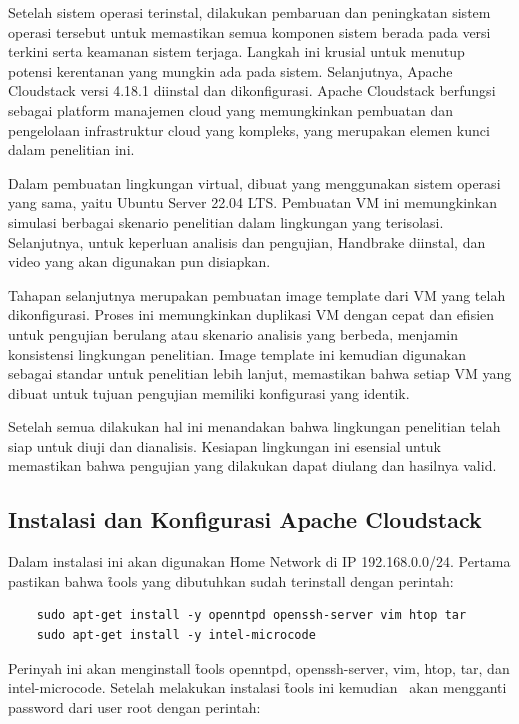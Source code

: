 Setelah sistem operasi terinstal, dilakukan pembaruan dan peningkatan sistem operasi tersebut untuk memastikan semua komponen sistem berada pada versi terkini serta keamanan sistem terjaga. Langkah ini krusial untuk menutup potensi kerentanan yang mungkin ada pada sistem. Selanjutnya, Apache Cloudstack versi 4.18.1 diinstal dan dikonfigurasi. Apache Cloudstack berfungsi sebagai platform manajemen cloud yang memungkinkan pembuatan dan pengelolaan infrastruktur cloud yang kompleks, yang merupakan elemen kunci dalam penelitian ini.

Dalam pembuatan lingkungan virtual, dibuat \vm yang menggunakan sistem operasi yang sama, yaitu Ubuntu Server 22.04 LTS. Pembuatan VM ini memungkinkan simulasi berbagai skenario penelitian dalam lingkungan yang terisolasi. Selanjutnya, untuk keperluan analisis dan pengujian, Handbrake diinstal, dan video yang akan digunakan pun disiapkan.

Tahapan selanjutnya merupakan pembuatan image template dari VM yang telah dikonfigurasi. Proses ini memungkinkan duplikasi VM dengan cepat dan efisien untuk pengujian berulang atau skenario analisis yang berbeda, menjamin konsistensi lingkungan penelitian. Image template ini kemudian digunakan sebagai standar untuk penelitian lebih lanjut, memastikan bahwa setiap VM yang dibuat untuk tujuan pengujian memiliki konfigurasi yang identik.

Setelah semua dilakukan hal ini menandakan bahwa lingkungan penelitian telah siap untuk diuji dan dianalisis. Kesiapan lingkungan ini esensial untuk memastikan bahwa pengujian yang dilakukan dapat diulang dan hasilnya valid.

\subsection{Instalasi dan Konfigurasi Apache Cloudstack}
Dalam instalasi ini akan digunakan \f{Home Network} di IP 192.168.0.0/24. Pertama pastikan bahwa \f{tools} yang dibutuhkan sudah terinstall dengan perintah:

\begin{verbatim}
    sudo apt-get install -y openntpd openssh-server vim htop tar
    sudo apt-get install -y intel-microcode
\end{verbatim}

Perinyah ini akan menginstall \f{tools} openntpd, openssh-server, vim, htop, tar, dan intel-microcode. Setelah melakukan instalasi \f{tools} ini kemudian \saya\ akan mengganti password dari user root dengan perintah:

